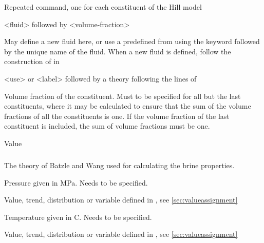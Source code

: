 {
 \slist
   \item \Description Repeated command, one for each constituent of the Hill model
   \item \Argument <fluid> followed by <volume-fraction>
   \item \Default
 \elist

 \slist
   \item \Description May define a new fluid here, or use a predefined  from  using the keyword  followed by the unique name of the fluid. When a new fluid is defined, follow the construction of  in 
   \item \Argument <use> or <label> followed by a theory following the lines of 
   \item \Default
 \elist

 \slist
   \item \Description Volume fraction of the constituent. Must to be specified for all but the last constituents, where it may be calculated to ensure that the sum of the volume fractions of all the constituents is one. If the volume fraction of the last constituent is included, the sum of volume fractions must be one. 
   \item \Argument Value
   \item \Default
 \elist

\subparagraph{}
 \slist
   \item \Description The theory of Batzle and Wang used for calculating the brine properties.
   \item \Argument 
   \item \Default 
 \elist

 \slist
   \item \Description Pressure given in MPa. Needs to be specified.
   \item \Argument Value, trend, distribution or variable defined in , see \autoref{sec:valueassignment}
   \item \Default
 \elist

 \slist
   \item \Description Temperature given in C. Needs to be specified.
   \item \Argument Value, trend, distribution or variable defined in , see \autoref{sec:valueassignment}
   \item \Default
 \elist

}
